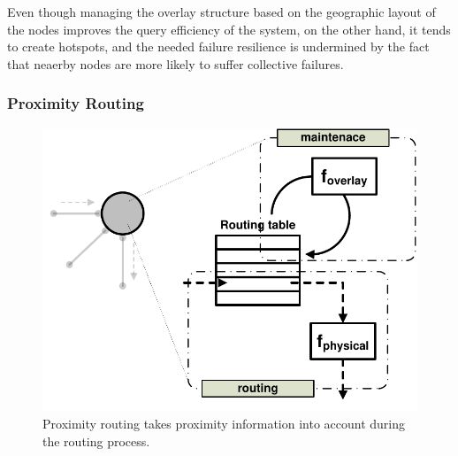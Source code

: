 Even though managing the overlay structure based on the geographic layout of the
nodes improves the query efficiency of the system, on the other hand, it tends
to create hotspots, and the needed failure resilience is undermined by the fact
that neaerby nodes are more likely to suffer collective failures.


%
%
%

\subsubsection{Proximity Routing}

\begin{figure}[ht]
\centering
  \includegraphics[scale=0.4]{img/pdf/proximity-routing.pdf}
\caption{Proximity routing takes proximity information into account during the
routing process.}
\label{figure:proximity-routing}
\end{figure}

